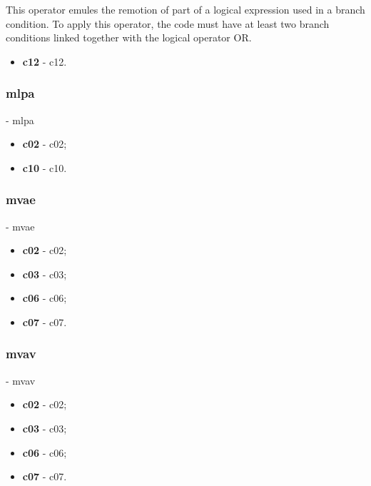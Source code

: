	This operator emules the remotion of part of a logical expression used in a branch condition. To apply this operator, the code must have at least two branch conditions linked together with the logical operator OR. 
	\begin{itemize}
		\item \textbf{\acs{c12}} - \Acl{c12}.
	\end{itemize}

	\hypertarget{mlpa}{}
	\subsubsection{\textbf{\acs{mlpa}}} - \Acl{mlpa}

	\begin{itemize}
		\item \textbf{\acs{c02}} - \Acl{c02};
		\item \textbf{\acs{c10}} - \Acl{c10}.
	\end{itemize}

	\hypertarget{mvae}{}
	\subsubsection{\textbf{\acs{mvae}}} - \Acl{mvae}

	\begin{itemize}
		\item \textbf{\acs{c02}} - \Acl{c02};
		\item \textbf{\acs{c03}} - \Acl{c03};
		\item \textbf{\acs{c06}} - \Acl{c06};
		\item \textbf{\acs{c07}} - \Acl{c07}.
	\end{itemize}

	\hypertarget{mvav}{}
	\subsubsection{\textbf{\acs{mvav}}} - \Acl{mvav}

	\begin{itemize}
		\item \textbf{\acs{c02}} - \Acl{c02};
		\item \textbf{\acs{c03}} - \Acl{c03};
		\item \textbf{\acs{c06}} - \Acl{c06};
		\item \textbf{\acs{c07}} - \Acl{c07}.
	\end{itemize}

